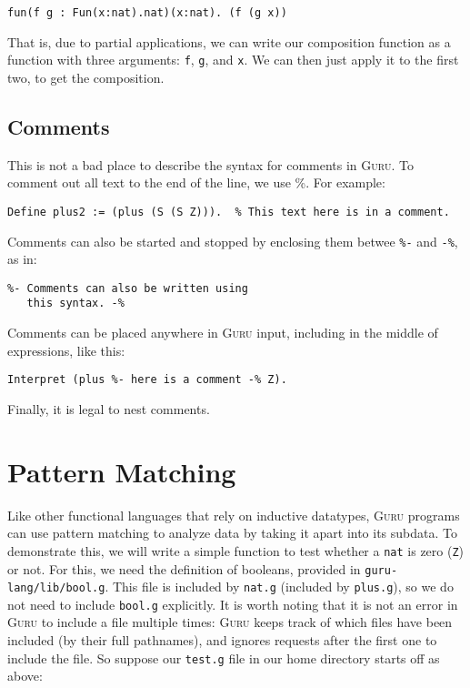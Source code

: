 \documentclass{book}[12pt]
\newcommand{\guru}[0]{\textsc{Guru}\xspace}
\begin{document}
\begin{verbatim}
fun(f g : Fun(x:nat).nat)(x:nat). (f (g x))
\end{verbatim}

\noindent That is, due to partial applications, we can write our
composition function as a function with three arguments: \texttt{f},
\texttt{g}, and \texttt{x}.  We can then just apply it to the first
two, to get the composition.

\subsection{Comments}

This is not a bad place to describe the syntax for comments in \guru.  To
comment out all text to the end of the line, we use \%.  For example:

\begin{verbatim}
Define plus2 := (plus (S (S Z))).  % This text here is in a comment.
\end{verbatim}

\noindent Comments can also be started and stopped by enclosing them
betwee \texttt{\%-} and \texttt{-\%}, as in:

\begin{verbatim}
%- Comments can also be written using
   this syntax. -%
\end{verbatim}

\noindent Comments can be placed anywhere in \guru input, including in the
middle of expressions, like this:

\begin{verbatim}
Interpret (plus %- here is a comment -% Z).
\end{verbatim}

\noindent Finally, it is legal to nest comments.

\section{Pattern Matching}

Like other functional languages that rely on inductive datatypes,
\guru programs can use pattern matching to analyze data by taking it
apart into its subdata.  To demonstrate this, we will write a simple
function to test whether a \texttt{nat} is zero (\texttt{Z}) or not.
For this, we need the definition of booleans, provided in
\texttt{guru-lang/lib/bool.g}.  This file is included by
\texttt{nat.g} (included by \texttt{plus.g}), so we do not need to
include \texttt{bool.g} explicitly.  It is worth noting that it is not
an error in \guru to include a file multiple times: \guru keeps track
of which files have been included (by their full pathnames), and
ignores requests after the first one to include the file.  So suppose
our \texttt{test.g} file in our home directory starts off as above:
\end{document}
